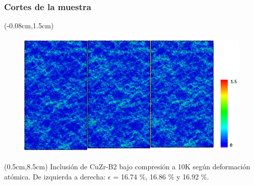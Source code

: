 \begin{frame}
  \frametitle{Cortes de la muestra}
  \begin{textblock*}{12.6cm}(-0.08cm,1.5cm) 
    \begin{figure}[htp]
     \centering
     \includegraphics[height=6cm]{../ResumenImagenes/Figures/NanoParticles/Snapshots/B2SphereCompression_10K_Snapshots.png}
    \end{figure}
  \end{textblock*}
  \begin{textblock*}{12cm}(0.5cm,8.5cm) 
    \centering
      \small{Inclusión de CuZr-B2 bajo compresión a 10K según deformación atómica. De izquierda a derecha: $\epsilon$ = 16.74 \%, 16.86 \% y 16.92 \%.}
    \end{textblock*}
\end{frame}

